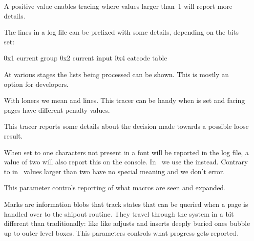 A positive value enables tracing where values larger than~1 will report more
details.

\stopnewprimitive

\startnewprimitive[title={\prm {tracinglevels}}]

The lines in a log file can be prefixed with some details, depending on the bits
set:

\starttabulate[|T|l|]
\NC 0x1 \NC current group \NC \NR
\NC 0x2 \NC current input \NC \NR
\NC 0x4 \NC catcode table \NC \NR
\stoptabulate

\stopnewprimitive

\startnewprimitive[title={\prm {tracinglists}}]

At various stages the lists being processed can be shown. This is mostly an
option for developers.

\stopnewprimitive

\startnewprimitive[title={\prm {tracingloners}}]

With loners we mean  and  lines. This tracer can be
handy when  is set and facing pages have different
penalty values.

\stopnewprimitive

\startnewprimitive[title={\prm {tracinglooseness}}]

This tracer reports some details about the decision made towards a possible
loose result.

\stopnewprimitive

\startoldprimitive[title={\prm {tracinglostchars}}]

When set to one characters not present in a font will be reported in the log
file, a value of two will also report this on the console. In \CONTEXT\ we use
the  instead. Contrary to in \LUATEX\ values larger than
two have no special meaning and we don't error.

\stopoldprimitive

\startoldprimitive[title={\prm {tracingmacros}}]

This parameter controls reporting of what macros are seen and expanded.

\stopoldprimitive

\startnewprimitive[title={\prm {tracingmarks}}]

Marks are information blobs that track states that can be queried when a page is
handled over to the shipout routine. They travel through the system in a bit
different than traditionally: like like adjusts and inserts deeply buried ones
bubble up to outer level boxes. This parameters controls what progress gets
reported.

